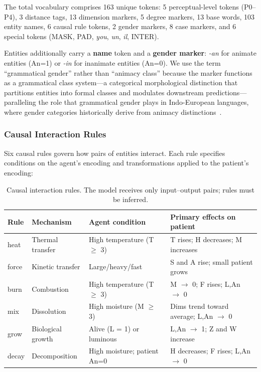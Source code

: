 \documentclass{article}
\begin{document}
The total vocabulary comprises 163 unique tokens: 5 perceptual-level tokens (P0--P4), 3 distance tags, 13 dimension markers, 5 degree markers, 13 base words, 103 entity names, 6 causal rule tokens, 2 gender markers, 8 case markers, and 6 special tokens (MASK, PAD, \textit{you}, \textit{un}, \textit{il}, INTER).

Entities additionally carry a \textbf{name} token and a \textbf{gender marker}: \textit{-an} for animate entities (An=1) or \textit{-in} for inanimate entities (An=0). We use the term ``grammatical gender'' rather than ``animacy class'' because the marker functions as a grammatical class system---a categorical morphological distinction that partitions entities into formal classes and modulates downstream predictions---paralleling the role that grammatical gender plays in Indo-European languages, where gender categories historically derive from animacy distinctions~\cite{corbett1991}.

\subsubsection{Causal Interaction Rules}

Six causal rules govern how pairs of entities interact. Each rule specifies conditions on the agent's encoding and transformations applied to the patient's encoding:

\begin{table}[htbp]
\centering
\small
\begin{tabular}{llll}
\toprule
Rule & Mechanism & Agent condition & Primary effects on patient \\
\midrule
heat & Thermal transfer & High temperature (T $\geq$ 3) & T rises; H decreases; M increases \\
force & Kinetic transfer & Large/heavy/fast & S and A rise; small patient grows \\
burn & Combustion & High temperature (T $\geq$ 3) & M $\rightarrow$ 0; F rises; L,An $\rightarrow$ 0 \\
mix & Dissolution & High moisture (M $\geq$ 3) & Dims trend toward average; L,An $\rightarrow$ 0 \\
grow & Biological growth & Alive (L = 1) or luminous & L,An $\rightarrow$ 1; Z and W increase \\
decay & Decomposition & High moisture; patient An=0 & H decreases; F rises; L,An $\rightarrow$ 0 \\
\bottomrule
\end{tabular}
\caption{Causal interaction rules. The model receives only input--output pairs; rules must be inferred.}
\label{tab:rules}
\end{table}
\end{document}
